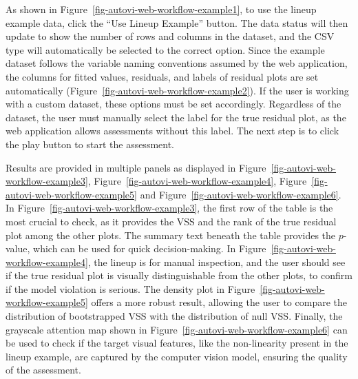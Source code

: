 \documentclass[
doublespace,
  times]{anzsauth}
\begin{document}
As shown in Figure~\ref{fig-autovi-web-workflow-example1}, to use the
lineup example data, click the ``Use Lineup Example'' button. The data
status will then update to show the number of rows and columns in the
dataset, and the CSV type will automatically be selected to the correct
option. Since the example dataset follows the variable naming
conventions assumed by the web application, the columns for fitted
values, residuals, and labels of residual plots are set automatically
(Figure~\ref{fig-autovi-web-workflow-example2}). If the user is working
with a custom dataset, these options must be set accordingly. Regardless
of the dataset, the user must manually select the label for the true
residual plot, as the web application allows assessments without this
label. The next step is to click the play button to start the
assessment.

Results are provided in multiple panels as displayed in
Figure~\ref{fig-autovi-web-workflow-example3},
Figure~\ref{fig-autovi-web-workflow-example4},
Figure~\ref{fig-autovi-web-workflow-example5} and
Figure~\ref{fig-autovi-web-workflow-example6}. In
Figure~\ref{fig-autovi-web-workflow-example3}, the first row of the
table is the most crucial to check, as it provides the VSS and the rank
of the true residual plot among the other plots. The summary text
beneath the table provides the \(p\)-value, which can be used for quick
decision-making. In Figure~\ref{fig-autovi-web-workflow-example4}, the
lineup is for manual inspection, and the user should see if the true
residual plot is visually distinguishable from the other plots, to
confirm if the model violation is serious. The density plot in
Figure~\ref{fig-autovi-web-workflow-example5} offers a more robust
result, allowing the user to compare the distribution of bootstrapped
VSS with the distribution of null VSS. Finally, the grayscale attention
map shown in Figure~\ref{fig-autovi-web-workflow-example6} can be used
to check if the target visual features, like the non-linearity present
in the lineup example, are captured by the computer vision model,
ensuring the quality of the assessment.
\end{document}
